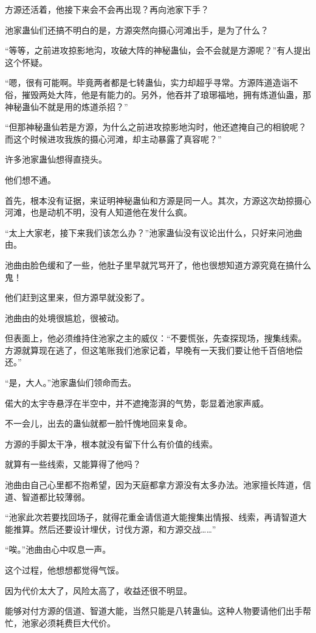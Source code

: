 \begin{this_body}
方源还活着，他接下来会不会再出现？再向池家下手？

池家蛊仙们还搞不明白的是，方源突然向摄心河滩出手，是为了什么？

“等等，之前进攻掠影地沟，攻破大阵的神秘蛊仙，会不会就是方源呢？”有人提出这个怀疑。

“嗯，很有可能啊。毕竟两者都是七转蛊仙，实力却超乎寻常。方源阵道造诣不俗，摧毁两处大阵，他是有能力的。另外，他吞并了琅琊福地，拥有炼道仙蛊，那神秘蛊仙不就是用的炼道杀招？”

“但那神秘蛊仙若是方源，为什么之前进攻掠影地沟时，他还遮掩自己的相貌呢？而这个时候进攻我族的摄心河滩，却主动暴露了真容呢？”

许多池家蛊仙想得直挠头。

他们想不通。

首先，根本没有证据，来证明神秘蛊仙和方源是同一人。其次，方源这次劫掠摄心河滩，也是动机不明，没有人知道他在发什么疯。

“太上大家老，接下来我们该怎么办？”池家蛊仙没有议论出什么，只好来问池曲由。

池曲由脸色缓和了一些，他肚子里早就咒骂开了，他也很想知道方源究竟在搞什么鬼！

他们赶到这里来，但方源早就没影了。

池曲由的处境很尴尬，很被动。

但表面上，他必须维持住池家之主的威仪：“不要慌张，先查探现场，搜集线索。方源就算现在逃了，但这笔账我们池家记着，早晚有一天我们要让他千百倍地偿还。”

“是，大人。”池家蛊仙们领命而去。

偌大的太宇寺悬浮在半空中，并不遮掩澎湃的气势，彰显着池家声威。

不一会儿，出去的蛊仙就都一脸忏愧地回来复命。

方源的手脚太干净，根本就没有留下什么有价值的线索。

就算有一些线索，又能算得了他吗？

池曲由自己心里都不抱希望，因为天庭都拿方源没有太多办法。池家擅长阵道，信道、智道都比较薄弱。

“池家此次若要找回场子，就得花重金请信道大能搜集出情报、线索，再请智道大能推算。然后还要设计埋伏，讨伐方源，和方源交战……”

“唉。”池曲由心中叹息一声。

这个过程，他想想都觉得气馁。

因为代价太大了，风险太高了，收益还很不明显。

能够对付方源的信道、智道大能，当然只能是八转蛊仙。这种人物要请他们出手帮忙，池家必须耗费巨大代价。


\end{this_body}
